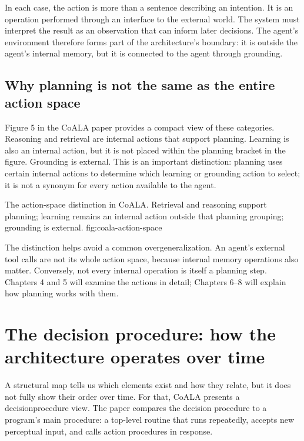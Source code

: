 In each case, the action is more than a sentence describing an intention. It is an operation performed through an interface to the external world. The system must interpret the result as an observation that can inform later decisions. The agent's environment therefore forms part of the architecture's boundary: it is outside the agent's internal memory, but it is connected to the agent through grounding.

\subsection{Why planning is not the same as the entire action space}

Figure 5 in the CoALA paper provides a compact view of these categories. Reasoning and retrieval are internal actions that support planning. Learning is also an internal action, but it is not placed within the planning bracket in the figure. Grounding is external. This is an important distinction: planning uses certain internal actions to determine which learning or grounding action to select; it is not a synonym for every action available to the agent.

  {The action-space distinction in CoALA. Retrieval and reasoning support planning; learning remains an internal action outside that planning grouping; grounding is external.}
  {fig:coala-action-space}

The distinction helps avoid a common overgeneralization. An agent's external tool calls are not its whole action space, because internal memory operations also matter. Conversely, not every internal operation is itself a planning step. Chapters 4 and 5 will examine the actions in detail; Chapters 6--8 will explain how planning works with them.

\section{The decision procedure: how the architecture operates over time}

A structural map tells us which elements exist and how they relate, but it does not fully show their order over time. For that, CoALA presents a \gls{decisionprocedure} view. The paper compares the decision procedure to a program's main procedure: a top-level routine that runs repeatedly, accepts new perceptual input, and calls action procedures in response.

